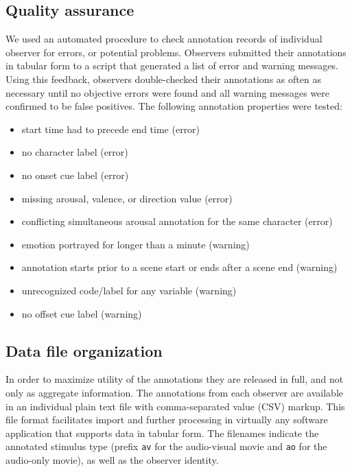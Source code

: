 \subsection*{Quality assurance}

We used an automated procedure to check annotation records of individual
observer for errors, or potential problems. Observers submitted their
annotations in tabular form to a script that generated a list of error and
warning messages. Using this feedback, observers double-checked their
annotations as often as necessary until no objective errors were found and
all warning messages were confirmed to be false positives. The following
annotation properties were tested:

\begin{itemize}
  \item start time had to precede end time (error)
  \item no character label (error)
  \item no onset cue label (error)
  \item missing arousal, valence, or direction value (error)
  \item conflicting simultaneous arousal annotation for the same character (error)
  \item emotion portrayed for longer than a minute (warning)
  \item annotation starts prior to a scene start or ends after a scene end
    (warning)
  \item unrecognized code/label for any variable (warning)
  \item no offset cue label (warning)
\end{itemize}

\subsection*{Data file organization}

In order to maximize utility of the annotations they are released in full, and
not only as aggregate information. The annotations from each observer are
available in an individual plain text file with comma-separated value (CSV)
markup. This file format facilitates import and further processing in virtually
any software application that supports data in tabular form. The filenames
indicate the annotated stimulus type (prefix \texttt{av} for the audio-visual
movie and \texttt{ao} for the audio-only movie), as well as the observer
identity.

